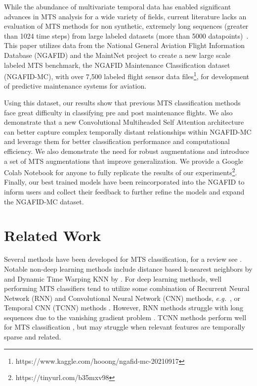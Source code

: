 \documentclass[letterpaper]{article} %
\newcommand{\eg}{{\textit{e.g.}}}
\begin{document}
While the abundance of multivariate temporal data has enabled significant advances in MTS analysis for a wide variety of fields, current literature lacks an evaluation of MTS methods for non synthetic, extremely long sequences (greater than 1024 time steps) from large labeled datasets (more than 5000 datapoints)~\cite{fawaz2019deep}. This paper utilizes data from the National General Aviation Flight Information Database (NGAFID) and the MaintNet project to create a new large scale labeled MTS benchmark, the NGAFID Maintenance Classification dataset (NGAFID-MC), with over 7,500 labeled flight sensor data files\footnote{https://www.kaggle.com/hooong/ngafid-mc-20210917}, for development of predictive maintenance systems for aviation.

Using this dataset, our results show that previous MTS classification methods face great difficulty in classifying pre and post maintenance flights. We also demonstrate that a new Convolutional Multiheaded Self Attention architecture can better capture complex temporally distant relationships within NGAFID-MC and leverage them for better classification performance and computational efficiency. We also demonstrate the need for robust augmentations and introduce a set of MTS augmentations that improve generalization. We provide a Google Colab Notebook for anyone to fully replicate the results of our experiments\footnote{https://tinyurl.com/b35mxv98}. Finally, our best trained models have been reincorporated into the NGAFID to inform users and collect their feedback to further refine the models and expand the NGAFID-MC dataset.










\section{Related Work}

Several methods have been developed for MTS classification, for a review see \cite{fawaz2019deep}. Notable non-deep learning methods include distance based k-nearest neighbors by \cite{orsenigo2010combining} and Dynamic Time Warping KNN by \cite{seto2015multivariate}. For deep learning methods, well performing MTS classifiers tend to utilize some combination of Recurrent Neural Network (RNN) and Convolutional Neural Network (CNN) methods, \eg~\cite{karim2017lstm}, or Temporal CNN (TCNN) methods  \cite{wang2017time}. However, RNN methods struggle with long sequences due to the vanishing gradient problem \cite{le2016quantifying}. TCNN methods perform well for MTS classification \cite{assaf2019mtex}, but may struggle when relevant features are temporally sparse and related.
\end{document}
